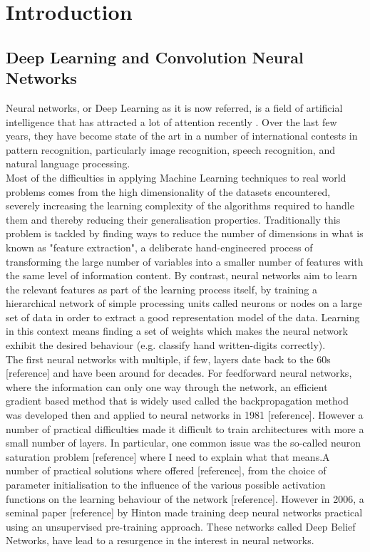 \chapter{Introduction}

\section{Deep Learning and Convolution Neural Networks}

\noindent Neural networks, or Deep Learning as it is now referred, is a field of artificial intelligence that has attracted a lot of attention recently \citep{NYT_article}. Over the last few years, they have become state of the art in a number of international contests in pattern recognition, particularly image recognition, speech recognition, and natural language processing\citep{Deep_Learning_overview}. \\

\noindent Most of the difficulties in applying Machine Learning techniques to real world problems comes from the high dimensionality of the datasets encountered, severely increasing the learning complexity of the algorithms required to handle them and thereby reducing their generalisation properties. Traditionally this problem is tackled by finding ways to reduce the number of dimensions in what is known as "feature extraction", a deliberate hand-engineered process of transforming the large number of variables into a smaller number of features with the same level of information content. By contrast, neural networks aim to learn the relevant features as part of the learning process itself, by training a hierarchical network of simple processing units called neurons or nodes on a large set of data in order to extract a good representation model of the data. Learning in this context means finding a set of weights which makes the neural network exhibit the desired behaviour (e.g. classify hand written-digits correctly).\\

\noindent The first neural networks with multiple, if few, layers date back to the 60s [reference] and have been around for decades. For feedforward neural networks, where the information can only one way through the network, an efficient gradient based method that is widely used called the backpropagation method was developed then and applied to neural networks in 1981 [reference]. However a number of practical difficulties made it difficult to train architectures with more a small number of layers. In particular, one common issue was the so-called neuron saturation problem [reference] where I need to explain what that means.A number of practical solutions where offered [reference], from the choice of parameter initialisation to the influence of the various possible activation functions on the learning behaviour of the network [reference]. However in 2006, a seminal paper [reference] by Hinton made training deep neural networks practical using an unsupervised pre-training approach. These networks called Deep Belief Networks, have lead to a resurgence in the interest in neural networks.\\

